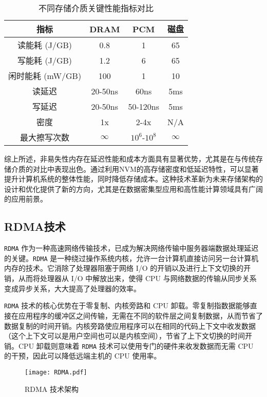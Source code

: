 \begin{table}[h]
    \centering
    \caption{不同存储介质关键性能指标对比}
    \label{tab:storage_comparison}
    \begin{tabular}{cccc}
    \toprule
    指标       & DRAM     & PCM      & 磁盘      \\
    \midrule
    读能耗 (J/GB) & 0.8      & 1        & 65       \\
    写能耗 (J/GB) & 1.2      & 6        & 65       \\
    闲时能耗 (mW/GB) & 100      & 1        & 10       \\
    读延迟     & 20-50ns   & 60ns      & 5ms       \\
    写延迟     & 20-50ns   & 50-120ns  & 5ms       \\
    密度       & 1x       & 2-4x     & N/A      \\
    最大擦写次数   & $\infty$ & $10^6$-$10^8$ & $\infty$ \\
    \bottomrule
    \end{tabular}
    \end{table}
综上所述，非易失性内存在延迟性能和成本方面具有显著优势，尤其是在与传统存储介质的对比中表现出色。通过利用NVM的高存储密度和低延迟特性，可以显著提升计算机系统的整体性能，同时降低存储成本。这种技术革新为未来存储架构的设计和优化提供了新的方向，尤其是在数据密集型应用和高性能计算领域具有广阔的应用前景。

\subsection{RDMA技术}

\texttt{RDMA} 作为一种高速网络传输技术，已成为解决网络传输中服务器端数据处理延迟的关键。\texttt{RDMA} 是一种绕过操作系统内核，允许一台计算机直接访问另一台计算机内存的技术。它消除了处理器阻塞于网络 I/O 的开销以及进行上下文切换的开销，从而将处理器从 I/O 中解放出来，使得 CPU 与网络数据的传输从同步关系变成异步关系，大大提高了处理器的效率。

\texttt{RDMA} 技术的核心优势在于零复制、内核旁路和 CPU 卸载。零复制指数据能够直接在应用程序的缓冲区之间传输，无需在不同的软件层之间复制数据，从而节省了数据复制的时间开销。内核旁路使应用程序可以在相同的代码上下文中收发数据（这个上下文可以是用户空间也可以是内核空间），节省了上下文切换的时间开销。CPU 卸载则意味着 \texttt{RDMA} 技术可以使用专门的硬件来收发数据而无需 CPU 的干预，因此可以降低远端主机的 CPU 使用率。

\begin{figure}[h]
    \centering
    \texttt{[image: RDMA.pdf]}
    \caption{RDMA 技术架构}
    \label{fig:RDMA}
\end{figure}

